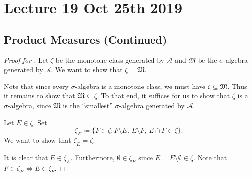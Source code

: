 \documentclass[notoc,notitlepage]{tufte-book}
\begin{document}


\chapter{Lecture 19 Oct 25th 2019}%
\label{chp:lecture_19_oct_25th_2019}

\section{Product Measures (Continued)}%
\label{sec:product_measures_continued}

\begin{proof}[Proof for ]
  Let $\zeta$ be the monotone class generated by $\mathcal{A}$
  and $\mathfrak{M}$ be the $\sigma$-algebra generated by $\mathcal{A}$.
  We want to show that $\zeta = \mathfrak{M}$.

  Note that since every $\sigma$-algebra is a monotone class,
  we must have $\zeta \subseteq \mathfrak{M}$.
  Thus it remains to show that $\mathfrak{M} \subseteq \zeta$.
  To that end, it suffices for us to show that $\zeta$ is a $\sigma$-algebra,
  since $\mathfrak{M}$ is the ``smallest'' $\sigma$-algebra
  generated by $\mathcal{A}$.

  Let $E \in \zeta$. Set
  \begin{equation*}
    \zeta_E \coloneqq \{ F \in \zeta
            : F \setminus E,\, E \setminus F,\, E \cap F \in \zeta \}.
  \end{equation*}
  We want to show that $\zeta_E = \zeta$.

  It is clear that $E \in \zeta_E$. Furthermore,
  $\emptyset \in \zeta_E$ since $E = E \setminus \emptyset \in \zeta$.
  Note that $F \in \zeta_E \iff E \in \zeta_F$.


\end{proof}
\end{document}
